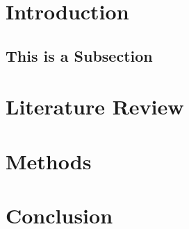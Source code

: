 \documentclass[12pt]{article}
\begin{document}


\tableofcontents
\newpage


\section{Introduction}\label{sec:intro}

\subsection{This is a Subsection}
 
%
\section{Literature Review}\label{sec:background}

%
\section{Methods}\label{sec:methods}

%
\section{Conclusion}\label{sec:conclusion}



\newpage


\nocite{*}


\end{document}

